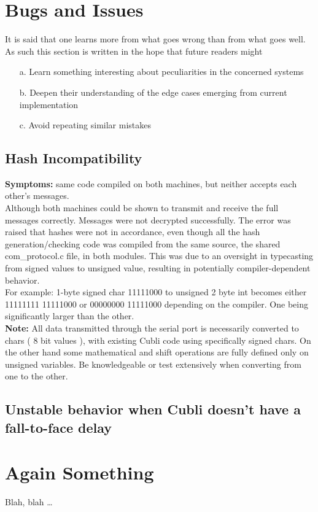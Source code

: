 \chapter{Bugs and Issues}\label{sec:bugsandissues}

It is said that one learns more from what goes wrong than from what goes well. As such this section is written in the hope that future readers might  
\begin{itemize}
\item[a.] Learn something interesting about peculiarities in the concerned systems
\item[b.] Deepen their understanding of the edge cases emerging from current implementation  
\item[c.]Avoid repeating similar mistakes 
\end{itemize}
 
\section{Hash Incompatibility}

\textbf{Symptoms:} same code compiled on both machines, but neither accepts each other's messages.\\
Although both machines could be shown to transmit and receive the full messages correctly. Messages were not decrypted successfully. The error was raised that hashes were not in accordance, even though all the hash generation/checking code was compiled from the same source, the shared com\_protocol.c file, in both modules. This was due to an oversight in typecasting from signed values to unsigned value, resulting in potentially compiler-dependent behavior. \\
For example: 1-byte signed char 11111000 to unsigned 2 byte int becomes either 11111111 11111000 or 00000000 11111000 depending on the compiler. One being significantly larger than the other.  \\
\textbf{Note:} All data transmitted through the serial port is necessarily converted to chars ( 8 bit values ), with existing Cubli code using specifically signed chars. On the other hand some mathematical and shift operations are fully defined only on unsigned variables. Be knowledgeable or test extensively when converting from one to the other.  
 
\section{Unstable behavior when Cubli doesn't have a fall-to-face delay} 

 \cleardoublepage


\chapter{Again Something}\label{sec:again_something}

Blah, blah \dots

 \cleardoublepage
